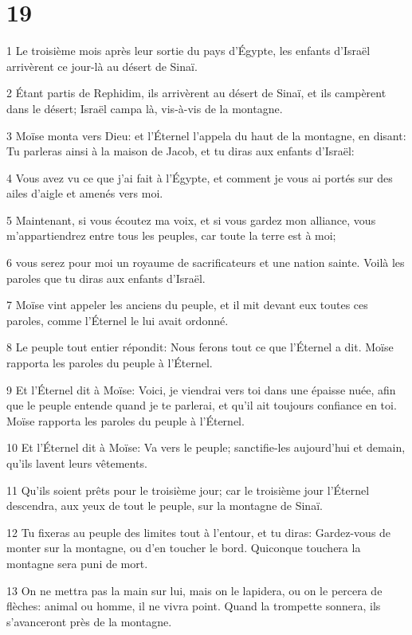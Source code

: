 \chapter{19}

\par 1 Le troisième mois après leur sortie du pays d'Égypte, les enfants d'Israël arrivèrent ce jour-là au désert de Sinaï.
\par 2 Étant partis de Rephidim, ils arrivèrent au désert de Sinaï, et ils campèrent dans le désert; Israël campa là, vis-à-vis de la montagne.
\par 3 Moïse monta vers Dieu: et l'Éternel l'appela du haut de la montagne, en disant: Tu parleras ainsi à la maison de Jacob, et tu diras aux enfants d'Israël:
\par 4 Vous avez vu ce que j'ai fait à l'Égypte, et comment je vous ai portés sur des ailes d'aigle et amenés vers moi.
\par 5 Maintenant, si vous écoutez ma voix, et si vous gardez mon alliance, vous m'appartiendrez entre tous les peuples, car toute la terre est à moi;
\par 6 vous serez pour moi un royaume de sacrificateurs et une nation sainte. Voilà les paroles que tu diras aux enfants d'Israël.
\par 7 Moïse vint appeler les anciens du peuple, et il mit devant eux toutes ces paroles, comme l'Éternel le lui avait ordonné.
\par 8 Le peuple tout entier répondit: Nous ferons tout ce que l'Éternel a dit. Moïse rapporta les paroles du peuple à l'Éternel.
\par 9 Et l'Éternel dit à Moïse: Voici, je viendrai vers toi dans une épaisse nuée, afin que le peuple entende quand je te parlerai, et qu'il ait toujours confiance en toi. Moïse rapporta les paroles du peuple à l'Éternel.
\par 10 Et l'Éternel dit à Moïse: Va vers le peuple; sanctifie-les aujourd'hui et demain, qu'ils lavent leurs vêtements.
\par 11 Qu'ils soient prêts pour le troisième jour; car le troisième jour l'Éternel descendra, aux yeux de tout le peuple, sur la montagne de Sinaï.
\par 12 Tu fixeras au peuple des limites tout à l'entour, et tu diras: Gardez-vous de monter sur la montagne, ou d'en toucher le bord. Quiconque touchera la montagne sera puni de mort.
\par 13 On ne mettra pas la main sur lui, mais on le lapidera, ou on le percera de flèches: animal ou homme, il ne vivra point. Quand la trompette sonnera, ils s'avanceront près de la montagne.
